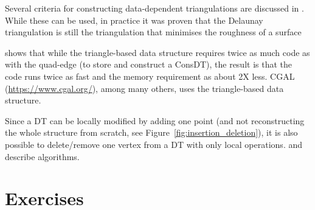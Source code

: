 Several criteria for constructing data-dependent triangulations are discussed in \citet{Dyn90}. 
While these can be used, in practice it was proven that the Delaunay triangulation is still the triangulation that minimises the roughness of a surface~\citep{Wang01,Rippa90}


\citet{Shewchuk97} shows that while the triangle-based data structure requires twice as much code as with the quad-edge (to store and construct a ConsDT), the result is that the code runs twice as fast and the memory requirement as about 2X less.
CGAL (\url{https://www.cgal.org/}), among many others, uses the triangle-based data structure.

Since a DT can be locally modified by adding one point (and not reconstructing the whole structure from scratch, see Figure~\ref{fig:insertion_deletion}), it is also possible to delete/remove one vertex from a DT with only local operations.
\citet{Mostafavi03} and \citet{Devillers09} describe algorithms.


%
\section{Exercises}


